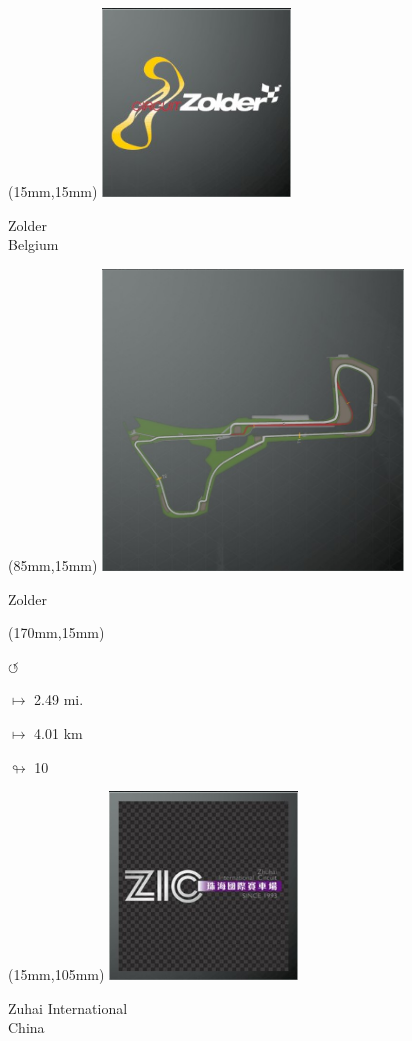 \begin{textblock*}{60mm}(15mm,15mm)%
\includegraphics[width=50mm]{LG/2015-05-20_00100.png}
\par Zolder\\ Belgium
\end{textblock*}
\begin{textblock*}{80mm}(85mm,15mm)%
\includegraphics[width=80mm]{TR/2015-05-20_00071.png}
\centerline{Zolder}
\end{textblock*}
\begin{textblock*}{30mm}(170mm,15mm)%
\par \Huge$\circlearrowleft$
\Large
\par$\mapsto$ 2.49 mi.
\par$\mapsto$ 4.01 km
\par$\looparrowright$ 10
\end{textblock*}
\begin{textblock*}{60mm}(15mm,105mm)%
\includegraphics[width=50mm]{LG/2015-05-20_00099.png}
\par Zuhai International\\ China
\end{textblock*}
